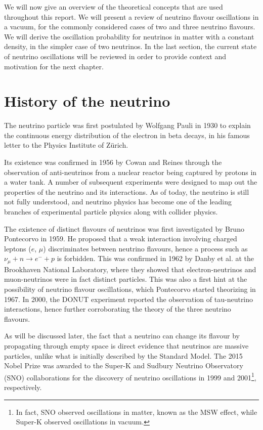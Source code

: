 \label{ch:osc}
We will now give an overview of the theoretical concepts that are used
throughout this report. We will present a review of neutrino flavour
oscillations in a vacuum, for the commonly considered cases of two and three
neutrino flavours. We will derive the oscillation probability for
neutrinos in matter with a constant density, in the simpler case of two
neutrinos. In the last section, the current state of neutrino oscillations will
be reviewed in order to provide context and motivation for the next chapter.


\section{History of the neutrino}
The neutrino particle was first postulated by Wolfgang Pauli in 1930 to explain
the continuous energy distribution of the electron in beta decays, in his
famous letter to the Physics Institute of Zürich\cite{pauli}. 

Its existence was confirmed in 1956 by Cowan and Reines\cite{cowan} through the
observation of anti-neutrinos from a nuclear reactor being captured by protons
in a water tank.
A number of subsequent experiments were designed to map out the properties of
the neutrino and its interactions\cite{zuber}. As of today, the neutrino is
still not fully understood, and neutrino physics has become one of the leading
branches of experimental particle physics along with collider physics. 

The existence of distinct flavours of neutrinos was first investigated by
Bruno Pontecorvo\cite{pontecorvo} in 1959. He proposed that a weak interaction
involving charged leptons ($e$, $\mu$) discriminates between neutrino flavours,
hence a process such as $\nu_\mu + n \rightarrow e^- + p$ is forbidden.
This was confirmed in 1962 by Danby et al.\cite{danby} at the Brookhaven
National Laboratory, where they showed that electron-neutrinos and
muon-neutrinos were in fact distinct particles.
This was also a first hint at the possibility of neutrino flavour oscillations,
which Pontecorvo\cite{pontecorvo-osc} started theorizing in 1967.
In 2000, the DONUT experiment\cite{donut} reported the observation of
tau-neutrino interactions, hence further corroborating the theory of the
three neutrino flavours.

As will be discussed later, the fact that a neutrino can change its flavour by
propagating through empty space is direct evidence that neutrinos are massive
particles, unlike what is initially described by the Standard Model.
The 2015 Nobel Prize was awarded to the Super-K and Sudbury Neutrino
Observatory (SNO) collaborations for the discovery of neutrino oscillations in
1999 and 2001\footnote{In fact, SNO observed oscillations in matter, known as
the MSW effect\cite{smirnov}, while Super-K observed oscillations in
vacuum.}, respectively.


